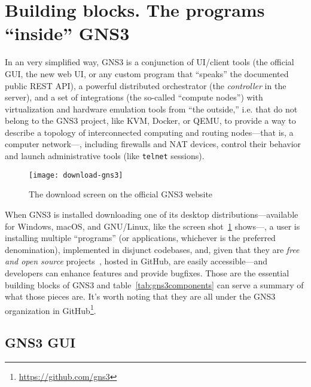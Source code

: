 \section{Building blocks. The programs ``inside'' GNS3}
\label{sec:gns3buildingblocks}

In an very simplified way, GNS3 is a conjunction of UI/client tools (the official GUI, the new web UI, or any custom program that ``speaks'' the documented public \acrshort{REST} API), a powerful distributed orchestrator (the \emph{controller} in the server), and a set of integrations (the so-called ``compute nodes'') with virtualization and hardware emulation tools from ``the outside,'' i.e. that do not belong to the GNS3 project, like KVM, Docker, or QEMU, to provide a way to describe a topology of interconnected computing and routing nodes---that is, a computer network---, including firewalls and NAT devices, control their behavior and launch administrative tools (like \texttt{telnet} sessions). %


\begin{figure}
  \centering
  \texttt{[image: download-gns3]}
  \caption{The download screen on the official GNS3 website}
  \label{fig:download-gns3}
\end{figure}

When GNS3 is installed downloading one of its desktop distributions---available for Windows, macOS, and GNU/Linux, like the screen shot~\ref{fig:download-gns3} shows---, a user is installing multiple ``programs'' (or applications, whichever is the preferred denomination), implemented in disjunct codebases, and, given that they are \emph{free and open source} projects~\cite{gplv3}, hosted in GitHub, are easily accessible---and developers can enhance features and provide bugfixes.
Those are the essential building blocks of GNS3 and table~\ref{tab:gns3components} can serve a summary of what those pieces are.
It's worth noting that they are all under the GNS3 organization in GitHub\footnote{\url{https://github.com/gns3}}.



\subsection{GNS3 GUI}
\label{subsec:gns3gui}

